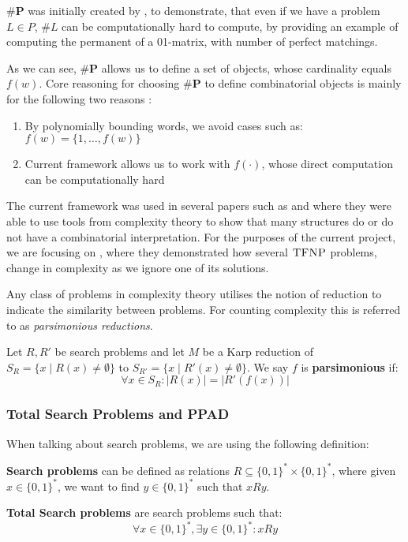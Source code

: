 $\textbf{\#P}$ was initially created by \cite{valiant_complexity_1979},
to demonstrate, that even if we have a problem $L \in P$, $\#L$ can be computationally
hard to compute, by providing an example of computing the permanent of
a 01-matrix, with number of perfect matchings. 

As we can see, $\textbf{\#P}$ allows us to define a set of objects,
whose cardinality equals $f(w)$. Core reasoning for choosing
$\textbf{\#P}$ to define combinatorial objects is mainly for the 
following two reasons \cite{ikenmeyer_positivity_2024}: 

\begin{enumerate}
    \item By polynomially bounding words, we avoid cases such as: $f(w) = \{1, \hdots, f(w)\}$
    \item Current framework allows us to work with $f(\cdot)$, whose direct computation can be computationally hard
\end{enumerate}


The current framework was used in several papers such as
\cite{ikenmeyer_what_2022} and \cite{ikenmeyer_positivity_2024}
where they were able to use tools from complexity theory to show that
many structures do or do not have a combinatorial interpretation.
For the purposes of the current project, we are focusing on \cite{ikenmeyer_what_2022},
where they demonstrated how several $\textsc{TFNP}$ problems, 
change in complexity as we ignore one of its solutions.


Any class of problems in complexity theory utilises the notion of reduction
to indicate the similarity between problems. For counting complexity
this is referred to as \textit{parsimonious reductions}.


\begin{definition}
    Let $R, R'$ be search problems and let $M$ be a Karp reduction of
    $S_R = \{x \mid R(x) \neq \emptyset \}$ to $S_{R'} = \{x \mid R'(x) \neq \emptyset \}$.
    We say $f$ is \textbf{parsimonious} if:
    $$
    \forall x \in S_R : |R(x)| = |R'(f(x))|
    $$ 
\end{definition}

\subsubsection{Total Search Problems and PPAD}
When talking about search problems, we are using the following definition:

\begin{definition}
    \textbf{Search problems} can be defined as relations $R \subseteq \{0,1\}^* \times \{0,1\}^*$,
    where given $x \in \{0,1\}^*$, we want to find $y \in \{0,1\}^*$  such that $x Ry$.

    \textbf{Total Search problems} are search problems such that:
    $$
    \forall x \in \{0,1\}^*, \exists y \in \{0,1\}^* : xRy
    $$
\end{definition}

